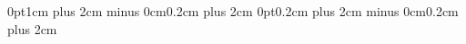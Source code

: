 \documentclass[11pt]{paper}
\author{Tamas Spisak}
\date{2020}
\title{\mytitle} %
\begin{document}
    \titlespacing*{\section}
    {0pt}{1cm plus 2cm minus 0cm}{0.2cm plus 2cm}
    \titlespacing*{\subsection}
    {0pt}{0.2cm plus 2cm minus 0cm}{0.2cm plus 2cm}

    \frontpage
    
    
    \setcounter{page}{2}

    \begin{large}
    
    
    
    
        
    \end{large}

    
    \footnotesize
    {\linespread{0}\selectfont}
\end{document}
